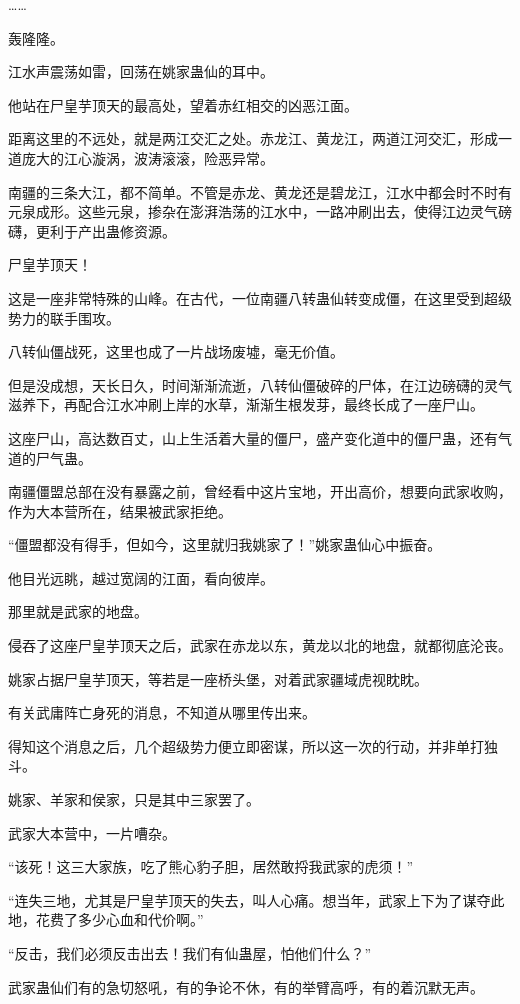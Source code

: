 \begin{this_body}
……

轰隆隆。

江水声震荡如雷，回荡在姚家蛊仙的耳中。

他站在尸皇芋顶天的最高处，望着赤红相交的凶恶江面。

距离这里的不远处，就是两江交汇之处。赤龙江、黄龙江，两道江河交汇，形成一道庞大的江心漩涡，波涛滚滚，险恶异常。

南疆的三条大江，都不简单。不管是赤龙、黄龙还是碧龙江，江水中都会时不时有元泉成形。这些元泉，掺杂在澎湃浩荡的江水中，一路冲刷出去，使得江边灵气磅礴，更利于产出蛊修资源。

尸皇芋顶天！

这是一座非常特殊的山峰。在古代，一位南疆八转蛊仙转变成僵，在这里受到超级势力的联手围攻。

八转仙僵战死，这里也成了一片战场废墟，毫无价值。

但是没成想，天长日久，时间渐渐流逝，八转仙僵破碎的尸体，在江边磅礴的灵气滋养下，再配合江水冲刷上岸的水草，渐渐生根发芽，最终长成了一座尸山。

这座尸山，高达数百丈，山上生活着大量的僵尸，盛产变化道中的僵尸蛊，还有气道的尸气蛊。

南疆僵盟总部在没有暴露之前，曾经看中这片宝地，开出高价，想要向武家收购，作为大本营所在，结果被武家拒绝。

“僵盟都没有得手，但如今，这里就归我姚家了！”姚家蛊仙心中振奋。

他目光远眺，越过宽阔的江面，看向彼岸。

那里就是武家的地盘。

侵吞了这座尸皇芋顶天之后，武家在赤龙以东，黄龙以北的地盘，就都彻底沦丧。

姚家占据尸皇芋顶天，等若是一座桥头堡，对着武家疆域虎视眈眈。

有关武庸阵亡身死的消息，不知道从哪里传出来。

得知这个消息之后，几个超级势力便立即密谋，所以这一次的行动，并非单打独斗。

姚家、羊家和侯家，只是其中三家罢了。

武家大本营中，一片嘈杂。

“该死！这三大家族，吃了熊心豹子胆，居然敢捋我武家的虎须！”

“连失三地，尤其是尸皇芋顶天的失去，叫人心痛。想当年，武家上下为了谋夺此地，花费了多少心血和代价啊。”

“反击，我们必须反击出去！我们有仙蛊屋，怕他们什么？”

武家蛊仙们有的急切怒吼，有的争论不休，有的举臂高呼，有的着沉默无声。


\end{this_body}
